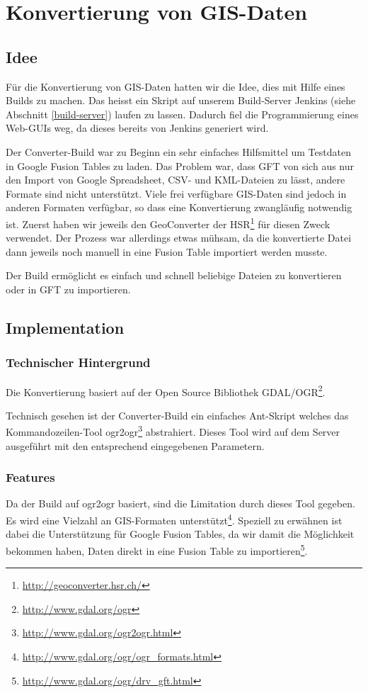 \chapter{Konvertierung von GIS-Daten}
\label{converter-build}

\section{Idee}
Für die Konvertierung von GIS-Daten hatten wir die Idee, dies mit Hilfe eines Builds zu machen. Das heisst ein Skript auf unserem Build-Server Jenkins (siehe Abschnitt \ref{build-server}) laufen zu lassen. Dadurch fiel die Programmierung eines Web-GUIs weg, da dieses bereits von Jenkins generiert wird.

Der Converter-Build war zu Beginn ein sehr einfaches Hilfsmittel um Testdaten in Google Fusion Tables zu laden. Das Problem war, dass GFT von sich aus nur den Import von Google Spreadsheet, \gls{CSV}- und \gls{KML}-Dateien zu lässt, andere Formate sind nicht unterstützt. Viele frei verfügbare \gls{GIS}-Daten sind jedoch in anderen Formaten verfügbar, so dass eine Konvertierung zwangläufig notwendig ist. Zuerst haben wir jeweils den GeoConverter der HSR\footnote{\url{http://geoconverter.hsr.ch/}} für diesen Zweck verwendet. Der Prozess war allerdings etwas mühsam, da die konvertierte Datei dann jeweils noch manuell in eine Fusion Table importiert werden musste.

Der Build ermöglicht es einfach und schnell beliebige Dateien zu konvertieren oder in GFT zu importieren.

\section{Implementation}
\subsection{Technischer Hintergrund}
Die Konvertierung basiert auf der Open Source Bibliothek GDAL/OGR\footnote{\url{http://www.gdal.org/ogr}}.

Technisch gesehen ist der Converter-Build ein einfaches Ant-Skript welches das Kommandozeilen-Tool ogr2ogr\footnote{\url{http://www.gdal.org/ogr2ogr.html}} abstrahiert. Dieses Tool wird auf dem Server ausgeführt mit den entsprechend eingegebenen Parametern. 

\subsection{Features}
Da der Build auf ogr2ogr basiert, sind die Limitation durch dieses Tool gegeben. Es wird eine Vielzahl an \gls{GIS}-Formaten unterstützt\footnote{\url{http://www.gdal.org/ogr/ogr_formats.html}}. Speziell zu erwähnen ist dabei die Unterstützung für Google Fusion Tables, da wir damit die Möglichkeit bekommen haben, Daten direkt in eine Fusion Table zu importieren\footnote{\url{http://www.gdal.org/ogr/drv_gft.html}}.


